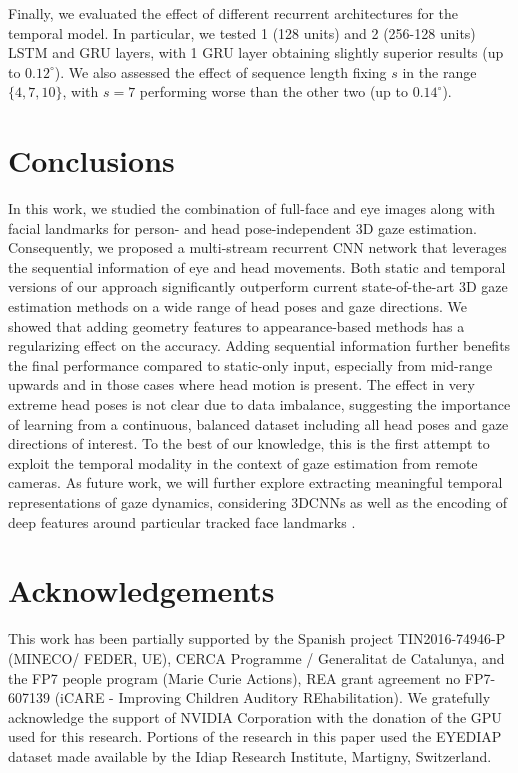 \documentclass{bmvc2k}
\begin{document}
Finally, we evaluated the effect of different recurrent architectures for the temporal model. In particular, we tested 1 (128 units) and 2 (256-128 units) LSTM and GRU layers, with 1 GRU layer obtaining slightly superior results (up to $0.12^\circ$). We also assessed the effect of sequence length fixing $s$ in the range $\{4,7,10\}$, with $s = 7$ performing worse than the other two (up to $0.14^\circ$). 

\section{Conclusions}
\label{sec:conclusions}


In this work, we studied the combination of full-face and eye images along with facial landmarks for person- and head pose-independent 3D gaze estimation. Consequently, we proposed a multi-stream recurrent CNN network that leverages the sequential information of eye and head movements. Both static and temporal versions of our approach significantly outperform current state-of-the-art 3D gaze estimation methods on a wide range of head poses and gaze directions. We showed that adding geometry features to appearance-based methods has a regularizing effect on the accuracy. Adding sequential information further benefits the final performance compared to static-only input, especially from mid-range upwards and in those cases where head motion is present. The effect in very extreme head poses is not clear due to data imbalance, suggesting the importance of learning from a continuous, balanced dataset including all head poses and gaze directions of interest. To the best of our knowledge, this is the first attempt to exploit the temporal modality in the context of gaze estimation from remote cameras. As future work, we will further explore extracting meaningful temporal representations of gaze dynamics, considering 3DCNNs as well as the encoding of deep features around particular tracked face landmarks \cite{jung2015joint}.

\section*{Acknowledgements}
This work has been partially supported by the Spanish project TIN2016-74946-P (MINECO/ FEDER, UE), CERCA Programme / Generalitat de Catalunya, and the FP7 people program (Marie Curie Actions), REA grant agreement no FP7-607139 (iCARE - Improving Children Auditory REhabilitation). We gratefully acknowledge the support of NVIDIA Corporation with the donation of the GPU used for this research. Portions of the research in this paper used the EYEDIAP dataset made available by the Idiap Research Institute, Martigny, Switzerland.



\end{document}
